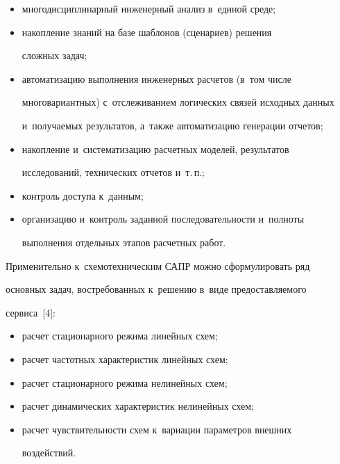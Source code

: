      \begin{itemize}


     \item многодисциплинарный инженерный анализ в~единой среде; 


     \item накопление знаний на базе шаблонов (сценариев) решения 


сложных задач; 


     \item автоматизацию выполнения инженерных расчетов (в~том числе 


многовариантных) с~отслеживанием логических связей исходных данных 


и~получаемых результатов, а~также автоматизацию генерации отчетов; 


     \item накопление и~систематизацию расчетных моделей, результатов 


исследований, технических отчетов и~т.\,п.; 


     \item контроль доступа к~данным; 


     \item организацию и~контроль заданной последовательности и~полноты 


выполнения отдельных этапов расчетных работ.


     \end{itemize}


     


     Применительно к~схемотехническим САПР можно сформулировать ряд 


основных задач, востребованных к~решению в~виде предоставляемого 


сервиса~[4]:


     \begin{itemize}


   \item  расчет стационарного режима линейных схем;


   \item расчет частотных характеристик линейных схем;


   \item расчет стационарного режима нелинейных схем;


   \item расчет динамических характеристик нелинейных схем;


   \item расчет чувствительности схем к~вариации параметров внешних 


воздействий.


   \end{itemize}


